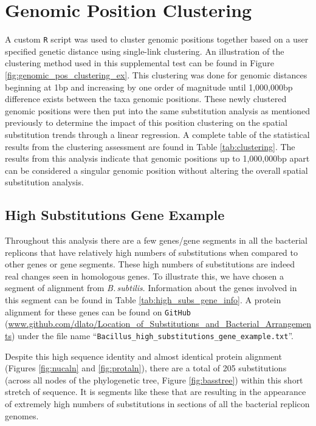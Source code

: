 \documentclass[11pt]{article}
\newcommand{\bass}{\textit{B.\,subtilis}\xspace}
\begin{document}
\section*{Genomic Position Clustering}
A custom \texttt{R} script was used to cluster genomic positions together based on a user specified genetic distance using single-link clustering.
An illustration of the clustering method used in this supplemental test can be found in Figure \ref{fig:genomic_pos_clustering_ex}.
This clustering was done for genomic distances beginning at 1bp and increasing by one order of magnitude until 1,000,000bp difference exists between the taxa genomic positions.
These newly clustered genomic positions were then put into the same substitution analysis as mentioned previously to determine the impact of this position clustering on the spatial substitution trends through a linear regression.
A complete table of the statistical results from the clustering assessment are found in Table \ref{tab:clustering}.
The results from this analysis indicate that genomic positions up to 1,000,000bp apart can be considered a singular genomic position without altering the overall spatial substitution analysis.

\subsection{High Substitutions Gene Example}
Throughout this analysis there are a few genes/gene segments in all the bacterial replicons that have relatively high numbers of substitutions when compared to other genes or gene segments.
These high numbers of substitutions are indeed real changes seen in homologous genes.
To illustrate this, we have chosen a segment of alignment from \bass.
Information about the genes involved in this segment can be found in Table \ref{tab:high_subs_gene_info}.
A protein alignment for these genes can be found on \texttt{GitHub} (\url{www.github.com/dlato/Location_of_Substitutions_and_Bacterial_Arrangements}) under the file name ``\texttt{Bacillus\_high\_substitutions\_gene\_example.txt}''.


Despite this high sequence identity and almost identical protein alignment (Figures \ref{fig:nucaln} and \ref{fig:protaln}), there are a total of 205 substitutions (across all nodes of the phylogenetic tree, Figure \ref{fig:basstree}) within this short stretch of sequence.
It is segments like these that are resulting in the appearance of extremely high numbers of substitutions in sections of all the bacterial replicon genomes.
\end{document}

